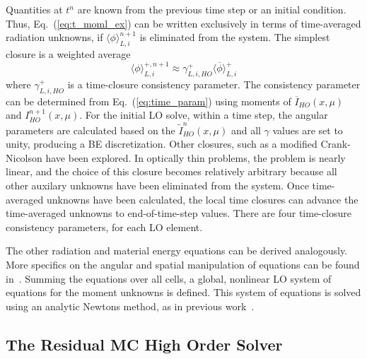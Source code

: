 \documentclass{anstrans}
\renewcommand{\eqref}[1]{(\ref{#1})}
\newcommand{\mom}[1]{\langle #1 \rangle}
\begin{document}
Quantities at $t^{n}$ are known from the previous time step or an initial condition.  
Thus, Eq.~\eqref{eq:t_moml_ex} can be written exclusively in terms
of time-averaged radiation unknowns, if $\mom{\phi}_{L,i}^{n+1}$ is eliminated from the
system.  The simplest closure is a weighted average
\begin{equation}\label{eq:time_param}
    \mom{\phi}_{L,i}^{+,n+1} \approx \gamma_{L,i,HO}^+ \mom{\overline{\phi}}_{L,i}^+
\end{equation}
where $\gamma_{L,i,HO}^+$ is a time-closure consistency parameter.  The consistency
parameter can be determined from Eq.~\eqref{eq:time_param} using moments of $\overline{I}_{HO}(x,\mu)$ and
$I^{n+1}_{HO}(x,\mu)$. For the initial LO solve, within a time step, the angular parameters
are calculated based on the $\tilde I_{HO}^n(x,\mu)$ and all $\gamma$ values are set to unity, producing a BE discretization.
Other closures, such as a modified Crank-Nicolson have been explored.  In optically
thin problems, the problem is nearly linear, and the choice of this closure becomes
relatively arbitrary because all other auxilary unknowns have been eliminated from the system.
Once time-averaged unknowns have been calculated, the local time closures can advance the time-averaged unknowns to end-of-time-step
values.  There are four time-closure consistency parameters, for each LO element. 

The other radiation and material energy equations can be derived analogously.  More specifics on the angular and spatial
manipulation of equations can be found in~\cite{bolding_nse}.  
Summing the equations over all cells, a global, nonlinear LO system of equations for the
moment unknowns is defined.  This system of equations is solved using an analytic Newtons method, as in
previous work~\cite{bolding_nse}. 


\subsection*{The Residual MC High Order Solver}
\label{sec:ho}
\end{document}
